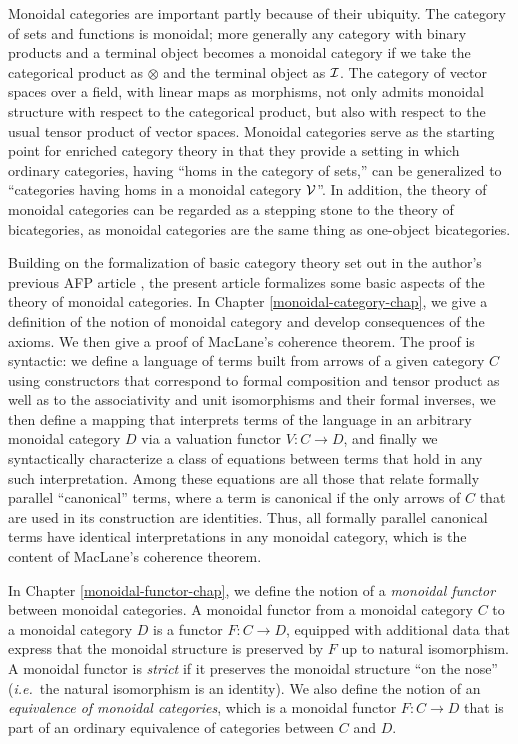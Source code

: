 \documentclass[11pt,notitlepage,a4paper]{report}
\begin{document}
Monoidal categories are important partly because of their ubiquity.
The category of sets and functions is monoidal; more generally any category
with binary products and a terminal object becomes a monoidal category if we
take the categorical product as $\otimes$ and the terminal object as ${\cal I}$.
The category of vector spaces over a field, with linear maps as morphisms,
not only admits monoidal structure with respect to the categorical product,
but also with respect to the usual tensor product of vector spaces.
Monoidal categories serve as the starting point for enriched category theory
in that they provide a setting in which ordinary categories,
having ``homs in the category of sets,'' can be generalized to
``categories having homs in a monoidal category ${\cal V}$''.
In addition, the theory of monoidal categories can be regarded as a
stepping stone to the theory of bicategories, as monoidal categories are
the same thing as one-object bicategories.

Building on the formalization of basic category theory set out in the author's
previous AFP article \cite{Category3-AFP}, the present article formalizes
some basic aspects of the theory of monoidal categories.
In Chapter \ref{monoidal-category-chap}, we give a definition of the
notion of monoidal category and develop consequences of the axioms.
We then give a proof of MacLane's coherence theorem.  The proof is syntactic:
we define a language of terms built from arrows of a given category $C$
using constructors that correspond to formal composition and tensor product
as well as to the associativity and unit isomorphisms and their formal inverses,
we then define a mapping that interprets terms of the language in an arbitrary
monoidal category $D$ via a valuation functor $V: C \rightarrow D$,
and finally we syntactically characterize a class of equations between terms
that hold in any such interpretation.  Among these equations are all those that
relate formally parallel ``canonical'' terms, where a term is canonical if
the only arrows of $C$ that are used in its construction are identities.
Thus, all formally parallel canonical terms have identical interpretations
in any monoidal category, which is the content of MacLane's coherence theorem.

In Chapter \ref{monoidal-functor-chap}, we define the notion of a
{\em monoidal functor} between monoidal categories.
A monoidal functor from a monoidal category $C$ to a monoidal category $D$
is a functor $F: C \rightarrow D$, equipped with additional data that
express that the monoidal structure is preserved by $F$ up to natural isomorphism.
A monoidal functor is {\em strict} if it preserves the monoidal structure
``on the nose'' ({\em i.e.}~the natural isomorphism is an identity).
We also define the notion of an {\em equivalence of monoidal categories},
which is a monoidal functor $F: C \rightarrow D$ that is part of an ordinary
equivalence of categories between $C$ and $D$.
\end{document}

